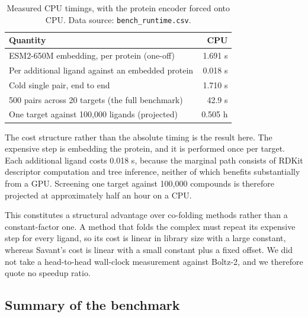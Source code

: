 \documentclass[11pt]{article}
\begin{document}
\begin{table}[H]
\centering
\caption{Measured CPU timings, with the protein encoder forced onto CPU. Data
source: \texttt{bench\_runtime.csv}.}
\label{tab:runtime}
\begin{tabular}{lr}
\toprule
Quantity & CPU \\
\midrule
ESM2-650M embedding, per protein (one-off) & 1.691 s \\
Per additional ligand against an embedded protein & 0.018 s \\
Cold single pair, end to end & 1.710 s \\
500 pairs across 20 targets (the full benchmark) & 42.9 s \\
One target against 100,000 ligands (projected) & 0.505 h \\
\bottomrule
\end{tabular}
\end{table}

The cost structure rather than the absolute timing is the result here. The
expensive step is embedding the protein, and it is performed once per target.
Each additional ligand costs 0.018 s, because the marginal path consists of
RDKit descriptor computation and tree inference, neither of which benefits
substantially from a GPU. Screening one target against 100,000 compounds is
therefore projected at approximately half an hour on a CPU.

This constitutes a structural advantage over co-folding methods rather than a
constant-factor one. A method that folds the complex must repeat its expensive
step for every ligand, so its cost is linear in library size with a large
constant, whereas Savant's cost is linear with a small constant plus a fixed
offset. We did not take a head-to-head wall-clock measurement against Boltz-2,
and we therefore quote no speedup ratio.

\subsection{Summary of the benchmark}
\end{document}
